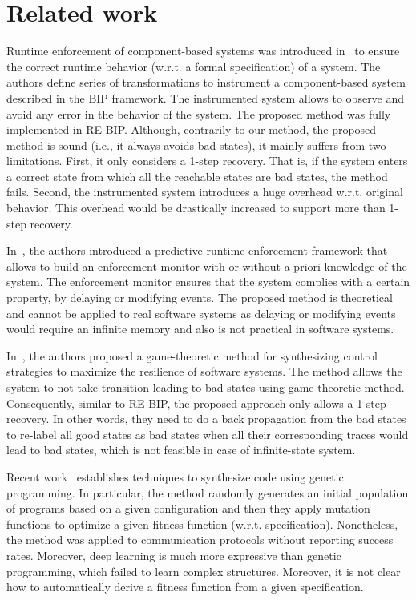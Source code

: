 \section{Related work}
\label{sec:rw}
Runtime enforcement of component-based systems was introduced in~\cite{CharafeddineEFJ15} to ensure the correct runtime behavior (w.r.t. a formal specification) of a system. 
The authors define series of transformations to instrument a component-based system described in the BIP framework. The instrumented system allows to observe and avoid any error in the behavior of the system. 
The proposed method was fully implemented in RE-BIP. 
Although, contrarily to our method, the proposed method is sound (i.e., it always avoids bad states), it mainly suffers from two limitations. First, it only considers a 1-step recovery. That is, if the system enters a correct state from which all the reachable states are bad states, the method fails.  Second, the instrumented system introduces a huge overhead w.r.t. original behavior. This overhead would be drastically increased to support more than 1-step recovery. 

In~\cite{PinisettyPTJFM16,PinisettyT16}, the authors introduced a predictive runtime enforcement framework that allows to build an enforcement monitor with or without a-priori knowledge of the system. 
The enforcement monitor ensures that the system complies with a certain property, by delaying or modifying events. The proposed method is theoretical and cannot be applied to real software systems as delaying or modifying events would require an infinite memory and also is not practical in software systems. 

In~\cite{HuangPSW16}, the authors proposed a game-theoretic method for synthesizing control strategies to maximize the resilience of software systems. The method allows the system to not take transition leading to bad states using game-theoretic method. Consequently,  similar to RE-BIP, the proposed approach only allows a 1-step recovery. In other words, they need to do a back propagation from the bad states to re-label all good states as bad states when all their corresponding traces would lead to bad states, which is not feasible in case of infinite-state system. 


Recent work~\cite{genetic1,genetic2,genetic3} establishes techniques to synthesize code using genetic programming.  In particular, the method randomly generates an initial population of programs based on a given configuration and then they apply mutation functions to optimize a given fitness function (w.r.t. specification). Nonetheless, the method was applied to communication protocols without reporting success rates. Moreover, deep learning is much more expressive than genetic programming, which failed to learn complex structures. Moreover, it is not clear how to automatically derive a fitness function from a given specification. 
